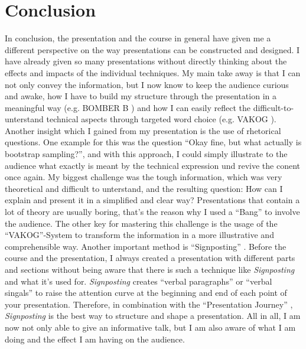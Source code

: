 \chapter{Conclusion}

In conclusion, the presentation and the course in general have given me a different perspective on the way presentations can be constructed and designed. I have already given so many presentations without directly thinking about the effects and impacts of the individual techniques. My main take away is that I can not only convey the information, but I now know to keep the audience curious and awake, how I have to build my structure through the presentation in a meaningful way (e.g. BOMBER B \autocite[]{bomberb}) and how I can easily reflect the difficult-to-unterstand technical aspects through targeted word choice (e.g. VAKOG \autocite[postnote]{JumbuhPrabowo.2015}). Another insight which I gained from my presentation is the use of rhetorical questions. One example for this was the question \enquote{Okay fine, but what actually is bootstrap sampling?}, and with this approach, I could simply illustrate to the audience what exactly is meant by the technical expression und revive the conent once again. My biggest challenge was the tough information, which was very theoretical and difficult to unterstand, and the resulting question: How can I explain and present it in a simplified and clear way? Presentations that contain a lot of theory are usually boring, that's the reason why I used a \enquote{Bang} \autocite[]{bomberb} to involve the audience. The other key for mastering this challenge is the usage of the \enquote{VAKOG}-System to transform the information in a more illustrative and comprehensible way. Another important method is \enquote{Signposting} \autocite{williams2008presentations}. Before the course and the presentation, I always created a presentation with different parts and sections without being aware that there is such a technique like \textit{Signposting} and what it's used for. \textit{Signposting} creates \enquote{verbal paragraphs} or \enquote{verbal singals} to raise the attention curve at the beginning and end of each point of your presentation. Therefore, in combination with the \enquote{Presentation Journey} \autocite{williams2008presentations}, \textit{Signposting} is the best way to structure and shape a presentation. All in all, I am now not only able to give an informative talk, but I am also aware of what I am doing and the effect I am having on the audience.